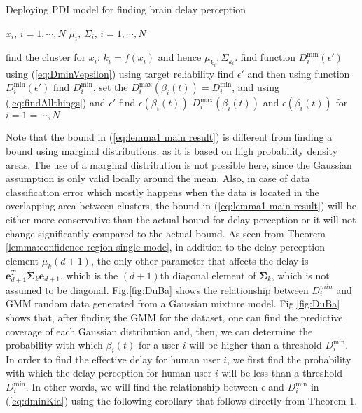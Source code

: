 \documentclass[journal,draftclsnofoot,onecolumn,12pt]{IEEEtran}%
\newcommand{\Sigmab}{\boldsymbol{\Sigma}}
\begin{document}
    
\begin{algorithm}[!t]
 \caption{{Deploying PDI model for finding brain delay perception}}
 {
 \begin{algorithmic}[1]
 \renewcommand{\algorithmicrequire}{\textbf{Input:}}
 \renewcommand{\algorithmicensure}{\textbf{Output:}}
 \REQUIRE $x_i$, $i=1,\cdots,N$
 \ENSURE  $\mu_i,\,\Sigma_i$, $i=1,\cdots,N$

  \STATE find the cluster for $x_i$: $k_i=f(x_i)$ and hence $\mu_{k_i},\Sigma_{k_i}$.
  \STATE find function  $D_i^{\min}(\epsilon')$ using (\ref{eq:DminVepsilon})
  \STATE using target reliability find $\epsilon'$ and then using function  $D_i^{\min} (\epsilon')$ find $D_i^{\min}$.
  \STATE set the $D_i^{\max}(\beta_i(t))=D_i^{\min}$, and using  (\ref{eq:findAllthings}) and $\epsilon'$ find $\epsilon(\beta_i(t))$ 
  \ENDFOR
 \RETURN $D_i^{\max}(\beta_i(t))$ and $\epsilon(\beta_i(t))$ for  $i=1=\cdots,N$
 \end{algorithmic} }
 \end{algorithm}




Note that the bound in (\ref{eq:lemma1 main result}) is different from finding a bound  using marginal distributions, as it is based on high probability density areas. The use of a marginal distribution is not possible here, since the Gaussian assumption is only valid locally around the mean. Also, in case of data classification error which mostly happens when the data is located in the overlapping area between clusters, the bound in (\ref{eq:lemma1 main result}) will be either more conservative than the actual bound for delay perception or it will not change significantly compared to the actual bound. As seen from Theorem \ref{lemma:confidence region single mode}, in addition to the delay perception element  $\mu_k(d+1)$, the only other parameter that affects the delay is $\boldsymbol{e}_{d+1}^T\Sigmab_k \boldsymbol{e}_{d+1}$, which is the $(d+1)$th diagonal element of $\Sigmab_k$, which is not assumed to be diagonal.
Fig.\ref{fig:DuBa} shows the relationship between $D_i^{min}$ and {GMM} random data generated from a Gaussian mixture model.  Fig.\ref{fig:DuBa} shows that, after finding the GMM for the dataset, one can find the predictive coverage of each Gaussian distribution and, then, we can determine the probability with which $\beta_i(t)$ for a user $i$ will be higher than a threshold $D_i^{\min}$. 
In order to find the effective delay for human user $i$, we first find the probability with which the  delay perception for human user $i$ will be less than a threshold $D_i^{\min}$. In other words, we will find the relationship between $\epsilon$ and $D_i^{\min}$ in (\ref{eq:dminKia}) using the following corollary that follows directly from Theorem 1.
\end{document}

